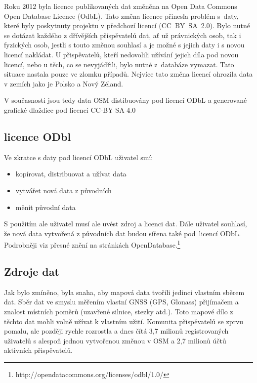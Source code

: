 Roku 2012 byla licence publikovaných dat změněna na Open Data Commons
Open Database Licence (OdbL).
Tato změna licence přinesla problém
s~daty, které byly poskytnuty projektu v předchozí licencí
(CC~BY~SA~2.0). Bylo nutné se dotázat každého z dřívějších
přispěvatelů dat, ať už právnických osob, tak i fyzických osob, jestli
s touto změnou souhlasí a je možné s jejich daty i s novou licencí
nakládat. U přispěvatelů, kteří nedovolili užívání jejich díla
pod novou licencí, nebo u těch, co se nevyjádřili, bylo nutné
z~databáze vymazat. Tato situace nastala pouze ve zlomku případů.
Nejvíce tato změna licencí ohrozila data v zemích jako je Polsko a Nový Zéland.

V současnosti jsou tedy data OSM distibuovány pod licencí ODbL a
generované grafické dlaždice pod licencí CC-BY SA 4.0
\cite {OSMlicenceIssue}

\subsection{licence ODbl}

Ve zkratce s daty pod licencí ODbL uživatel smí:
\begin{itemize}
    \item    kopírovat, distribuovat a užívat data
    \item    vytvářet nová data z původních
    \item    měnit původní data
\end{itemize}

S použitím ale uživatel musí ale uvést zdroj a licenci dat.
Dále uživatel souhlasí, že nová data vytvořená z původních dat budou sířena
také pod~licencí ODbL.
Podrobněji viz přesné znění na stránkách OpenDatabase.\footnote{http://opendatacommons.org/licenses/odbl/1.0/}


\subsection{Zdroje dat}
\label{Zdroje dat}

Jak bylo zmíněno, byla snaha, aby mapová data tvořili jedinci vlastním
sběrem dat. Sběr dat ve smyslu měřením vlastní GNSS (GPS, Glonass)
přijímačem a znalost místních poměrů (uzavřené silnice, stezky atd.).
Toto mapové dílo z těchto dat mohli volně užívat k vlastním užití.
Komunita přispěvatelů se zprvu pomalu, ale později rychle rozrostla a
dnes čítá 3,7 milionů registrovaných uživatelů s alespoň jednou
vytvořenou změnou v OSM a 2,7 milionů účtů aktivních přispěvatelů.\cite{OSMstats}


